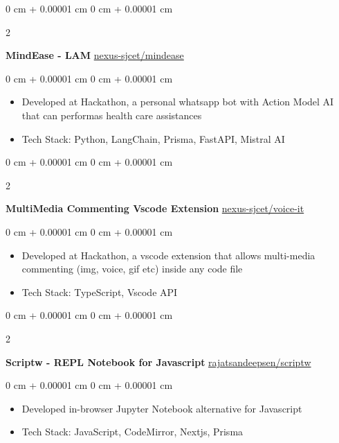 \documentclass[10pt, letterpaper]{article}
\newenvironment{highlights}{
    \begin{itemize}[
        topsep=0.10 cm,
        parsep=0.10 cm,
        partopsep=0pt,
        itemsep=0pt,
        leftmargin=0 cm + 10pt
    ]
}{
    \end{itemize}
} %
\newenvironment{onecolentry}{
    \begin{adjustwidth}{
        0 cm + 0.00001 cm
    }{
        0 cm + 0.00001 cm
    }
}{
    \end{adjustwidth}
} %
\newenvironment{twocolentry}[2][]{
    \onecolentry
    \def\secondColumn{#2}
    \setcolumnwidth{\fill, 4.5 cm}
    \begin{paracol}{2}
}{
    \switchcolumn \raggedleft \secondColumn
    \end{paracol}
    \endonecolentry
} %
\begin{document}
\begin{twocolentry}{
		\href{https://github.com/nexus-sjcet/mindease}{nexus-sjcet/mindease}
	}
	\textbf{MindEase - LAM}\end{twocolentry}

\vspace{0.10 cm}
\begin{onecolentry}
	\begin{highlights}
		\item Developed at Hackathon, a personal whatsapp bot with Action Model AI that can
		performas health care assistances
		\item Tech Stack: Python, LangChain, Prisma, FastAPI, Mistral AI
	\end{highlights}
\end{onecolentry}
\vspace{0.2 cm}

\begin{twocolentry}{
		\href{https://github.com/nexus-sjcet/voice-it}{nexus-sjcet/voice-it}
	}
	\textbf{MultiMedia Commenting Vscode Extension}\end{twocolentry}

\vspace{0.10 cm}
\begin{onecolentry}
	\begin{highlights}
		\item Developed at Hackathon, a vscode extension that allows multi-media commenting
		(img, voice, gif etc) inside any code file
		\item Tech Stack: TypeScript, Vscode API
	\end{highlights}
\end{onecolentry}
\vspace{0.2 cm}

\begin{twocolentry}{
		\href{https://github.com/rajatsandeepsen/scriptw}{rajatsandeepsen/scriptw}
	}
	\textbf{Scriptw - REPL Notebook for Javascript}\end{twocolentry}

\vspace{0.10 cm}
\begin{onecolentry}
	\begin{highlights}
		\item Developed in-browser Jupyter Notebook alternative for Javascript
		\item Tech Stack: JavaScript, CodeMirror, Nextjs, Prisma
	\end{highlights}
\end{onecolentry}
\vspace{0.2 cm}
\end{document}
